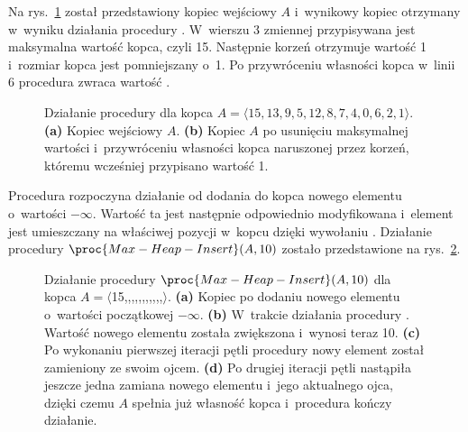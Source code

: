 
\exercise %
Na rys.\ \ref{fig:6.5-1} został przedstawiony kopiec wejściowy $A$ i~wynikowy kopiec otrzymany w~wyniku działania procedury .
W~wierszu 3 zmiennej  przypisywana jest maksymalna wartość kopca, czyli 15.
Następnie korzeń otrzymuje wartość 1 i~rozmiar kopca jest pomniejszany o~1.
Po przywróceniu własności kopca w~linii 6 procedura zwraca wartość .
\begin{figure}[!ht]
	\centering 
	\caption{Działanie procedury  dla kopca $A=\langle15,13,9,5,12,8,7,4,0,6,2,1\rangle$.
{\sffamily\bfseries(a)} Kopiec wejściowy $A$.
{\sffamily\bfseries(b)} Kopiec $A$ po usunięciu maksymalnej wartości i~przywróceniu własności kopca naruszonej przez korzeń, któremu wcześniej przypisano wartość 1.} \label{fig:6.5-1}
\end{figure}

\exercise %
Procedura  rozpoczyna działanie od dodania do kopca nowego elementu o~wartości $-\infty$.
Wartość ta jest następnie odpowiednio modyfikowana i~element jest umieszczany na właściwej pozycji w~kopcu dzięki wywołaniu .
Działanie procedury $\proc{Max-Heap-Insert}(A,10)$ zostało przedstawione na rys.\ \ref{fig:6.5-2}.
\begin{figure}[!ht]
	\centering 
	\caption{Działanie procedury $\proc{Max-Heap-Insert}(A,10)$ dla kopca $A=\langle$15,,,,,,,,,,,$\rangle$.
{\sffamily\bfseries(a)} Kopiec po dodaniu nowego elementu o~wartości początkowej $-\infty$.
{\sffamily\bfseries(b)} W~trakcie działania procedury .
Wartość nowego elementu została zwiększona i~wynosi teraz 10.
{\sffamily\bfseries(c)} Po wykonaniu pierwszej iteracji pętli  procedury  nowy element został zamieniony ze swoim ojcem.
{\sffamily\bfseries(d)} Po drugiej iteracji pętli nastąpiła jeszcze jedna zamiana nowego elementu i~jego aktualnego ojca, dzięki czemu $A$ spełnia już własność kopca i~procedura kończy działanie.} \label{fig:6.5-2}
\end{figure}

